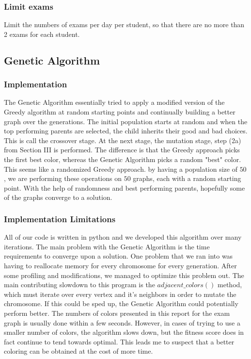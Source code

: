 \documentclass[12]{article}
\begin{document}
\subsubsection{Limit exams}
Limit the numbers of exams per day per student, so that there are no more than 2 exams for each student.

\subsection{Genetic Algorithm}
\subsubsection{Implementation}
The Genetic Algorithm essentially tried to apply a modified version of the Greedy algorithm at random starting points and continually building a better graph over the generations. The initial population starts at random and when the top performing parents are selected, the child inherits their good and bad choices. This is call the crossover stage. At the next stage, the mutation stage, step (2a) from Section III is performed. The difference is that the Greedy approach picks the first best color, whereas the Genetic Algorithm picks a random "best" color. This seems like a randomized Greedy approach. by having a population size of $50$, we are performing these operations on $50$ graphs, each with a random starting point. With the help of randomness and best performing parents, hopefully some of the graphs converge to a solution.

\subsubsection{Implementation Limitations}
All of our code is written in python and we developed this algorithm over many iterations. The main problem with the Genetic Algorithm is the time requirements to converge upon a solution. One problem that we ran into was having to reallocate memory for every chromosome for every generation. After some profiling and modifications, we managed to optimize this problem out. The main contributing slowdown to this program is the $adjacent\_colors()$ method, which must iterate over every vertex and it's neighbors in order to mutate the chromosome. If this could be sped up, the Genetic Algorithm could potentially perform better. The numbers of colors presented in this report for the exam graph is usually done within a few seconds. However, in cases of trying to use a smaller number of colors, the algorithm slows down, but the fitness score does in fact continue to tend towards optimal. This leads me to suspect that a better coloring can be obtained at the cost of more time.
\end{document}
